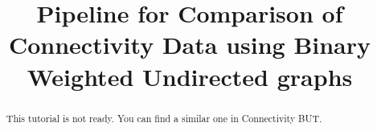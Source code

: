 \documentclass[justified]{tufte-handout}
\title{Pipeline for Comparison of Connectivity Data using Binary Weighted Undirected graphs}
\begin{document}
\maketitle

\begin{abstract}
\noindent
This tutorial is not ready. You can find a similar one in Connectivity BUT.
\end{abstract}
\end{document}
